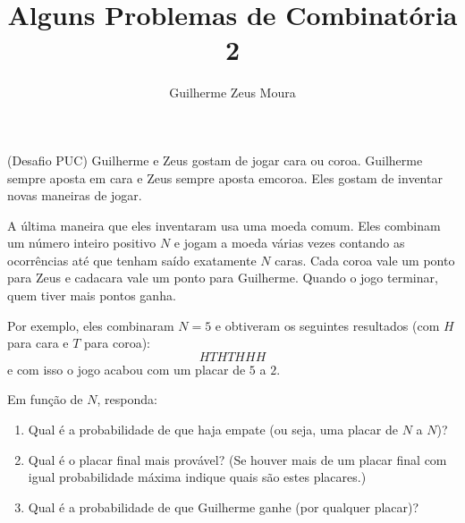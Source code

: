 \documentclass[10pt,a4paper]{article}
\title{Alguns Problemas de Combinatória 2}
\author{Guilherme Zeus Moura}
\renewcommand\playerA[1]{Guilherme}
\renewcommand\playerB[1]{Zeus}
\begin{document}
	
	\zeustitle
	\begin{prob}(Desafio PUC)
		\playerA{Rosencrantz} e \playerB{Guildenstern} gostam de jogar cara ou coroa.
		\playerA{Rosencrantz} sempre aposta em cara e \playerB{Guildenstern} sempre aposta emcoroa. 
		Eles gostam de inventar novas maneiras de jogar.
		
		A última maneira que eles inventaram usa uma moeda comum. 
		Eles combinam um número inteiro positivo $N$ e jogam a moeda várias vezes contando as ocorrências até que tenham saído exatamente $N$ caras.
		Cada coroa vale um ponto para \playerB{Guildenstern} e cadacara vale um ponto para \playerA{Rosencrantz}.
		Quando o jogo terminar, quem tiver mais pontos ganha.
		
		Por exemplo, eles combinaram $N = 5$ e obtiveram os seguintes resultados (com $H$ para cara e $T$ para coroa): $$HTHTHHH$$ e com isso o jogo acabou com um placar de $5$ a $2$.
		
		Em função de $N$, responda:
		\begin{enumerate}[label = (\alph*)]
			\item Qual é a probabilidade de que haja empate (ou seja, uma placar de $N$ a $N$)?
			\item Qual é o placar final mais provável?
				(Se houver mais de um placar final com igual probabilidade máxima indique quais são estes placares.)
			\item Qual é a probabilidade de que \playerA{Rosencrantz} ganhe (por qualquer placar)?
		\end{enumerate}
	\end{prob}
\end{document}

